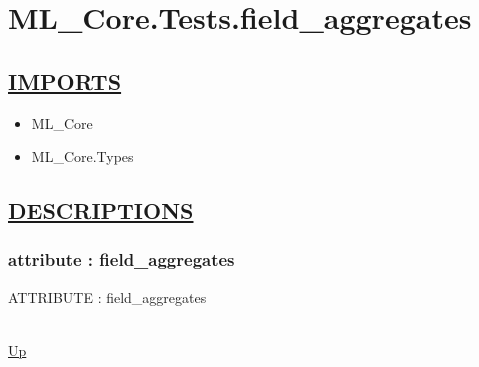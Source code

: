 \chapter*{ML\_Core.Tests.field\_aggregates}
\hypertarget{ML_Core.Tests.field_aggregates}{}

\section*{\underline{IMPORTS}}
\begin{itemize}
\item ML\_Core
\item ML\_Core.Types
\end{itemize}

\section*{\underline{DESCRIPTIONS}}
\subsection*{attribute : field\_aggregates}
\hypertarget{ecldoc:ml_core.tests.field_aggregates}{ATTRIBUTE : field\_aggregates} \\
\hyperlink{ecldoc:}{Up} \\
\par
